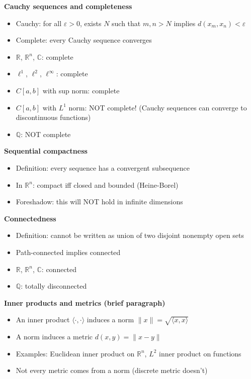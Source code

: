 \documentclass[
  10pt,
  letterpaper,
]{scrbook}
\providecommand{\tightlist}{%
  \setlength{\itemsep}{0pt}\setlength{\parskip}{0pt}}
\begin{document}
\textbf{Cauchy sequences and completeness}

\begin{itemize}
\tightlist
\item
  Cauchy: for all \(\varepsilon > 0\), exists \(N\) such that
  \(m, n > N\) implies \(d(x_m, x_n) < \varepsilon\)
\item
  Complete: every Cauchy sequence converges
\item
  \(\mathbb{R}\), \(\mathbb{R}^n\), \(\mathbb{C}\): complete
\item
  \(\ell^1\), \(\ell^2\), \(\ell^\infty\): complete
\item
  \(C[a,b]\) with sup norm: complete
\item
  \(C[a,b]\) with \(L^1\) norm: NOT complete! (Cauchy sequences can
  converge to discontinuous functions)
\item
  \(\mathbb{Q}\): NOT complete
\end{itemize}

\textbf{Sequential compactness}

\begin{itemize}
\tightlist
\item
  Definition: every sequence has a convergent subsequence
\item
  In \(\mathbb{R}^n\): compact iff closed and bounded (Heine-Borel)
\item
  Foreshadow: this will NOT hold in infinite dimensions
\end{itemize}

\textbf{Connectedness}

\begin{itemize}
\tightlist
\item
  Definition: cannot be written as union of two disjoint nonempty open
  sets
\item
  Path-connected implies connected
\item
  \(\mathbb{R}\), \(\mathbb{R}^n\), \(\mathbb{C}\): connected
\item
  \(\mathbb{Q}\): totally disconnected
\end{itemize}

\textbf{Inner products and metrics (brief paragraph)}

\begin{itemize}
\tightlist
\item
  An inner product \(\langle \cdot, \cdot \rangle\) induces a norm
  \(\|x\| = \sqrt{\langle x, x \rangle}\)
\item
  A norm induces a metric \(d(x,y) = \|x - y\|\)
\item
  Examples: Euclidean inner product on \(\mathbb{R}^n\), \(L^2\) inner
  product on functions
\item
  Not every metric comes from a norm (discrete metric doesn't)
\end{itemize}
\end{document}

